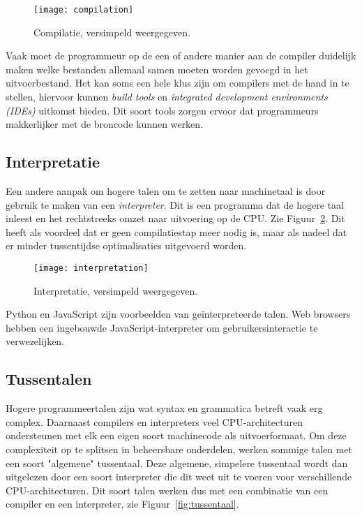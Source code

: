 \documentclass[dutch,a4paper,12pt,doubleside]{book}
\begin{document}
\begin{figure}[H]
    \centering
    \texttt{[image: compilation]}
    \caption{Compilatie, versimpeld weergegeven.}
    \label{fig:compiler}
\end{figure}

Vaak moet de programmeur op de een of andere manier aan de compiler duidelijk 
maken welke bestanden allemaal samen moeten worden gevoegd in het uitvoerbestand.
Het kan soms een hele klus zijn om compilers met de hand in te stellen, 
hiervoor kunnen \textit{build tools} en 
\textit{integrated development environments (IDEs)}
uitkomst bieden. Dit soort tools zorgen ervoor dat programmeurs 
makkerlijker met de broncode kunnen werken.

\subsection{Interpretatie}
Een andere aanpak om hogere talen om te zetten naar machinetaal is door 
gebruik te maken van een \textit{interpreter}. Dit is een programma dat 
de hogere taal inleest en het rechtstreeks omzet naar uitvoering op de 
CPU. Zie Figuur~\ref{fig:interpreter}. Dit heeft als voordeel dat er geen compilatiestap meer nodig is, 
maar als nadeel dat er minder tussentijdse optimalisaties uitgevoerd worden.

\begin{figure}[H]
    \centering
    \texttt{[image: interpretation]}
    \caption{Interpretatie, versimpeld weergegeven.}
    \label{fig:interpreter}
\end{figure}

Python en JavaScript zijn voorbeelden van geïnterpreteerde talen. Web browsers
hebben een ingebouwde JavaScript-interpreter om gebruikersinteractie te verwezelijken.

\subsection{Tussentalen}
Hogere programmeertalen zijn wat syntax en grammatica betreft vaak 
erg complex. Daarnaast compilers en interpreters veel CPU-architecturen 
ondersteunen met elk een eigen soort machinecode als uitvoerformaat.
Om deze complexiteit op te splitsen in beheersbare onderdelen, 
werken sommige talen met een soort "algemene" tussentaal. Deze algemene,
simpelere tussentaal wordt dan uitgelezen door een soort interpreter 
die dit weet uit te voeren voor verschillende CPU-architecturen.
Dit soort talen werken dus met een combinatie van een compiler en 
een interpreter, zie Figuur~\ref{fig:tussentaal}.
\end{document}
